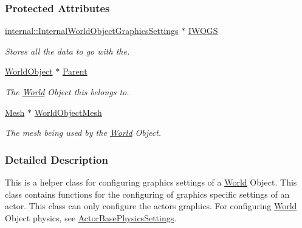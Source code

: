 \subsubsection*{Protected Attributes}
\begin{DoxyCompactItemize}
\item 
\hypertarget{classMezzanine_1_1WorldObjectGraphicsSettings_a8a0fc129db71e68740a5ab5fd33cb0d2}{
\hyperlink{classMezzanine_1_1internal_1_1InternalWorldObjectGraphicsSettings}{internal::InternalWorldObjectGraphicsSettings} $\ast$ \hyperlink{classMezzanine_1_1WorldObjectGraphicsSettings_a8a0fc129db71e68740a5ab5fd33cb0d2}{IWOGS}}
\label{classMezzanine_1_1WorldObjectGraphicsSettings_a8a0fc129db71e68740a5ab5fd33cb0d2}

\begin{DoxyCompactList}\small\item\em Stores all the data to go with the. \item\end{DoxyCompactList}\item 
\hypertarget{classMezzanine_1_1WorldObjectGraphicsSettings_a3c3e1552382dd78af68a561464bca083}{
\hyperlink{classMezzanine_1_1WorldObject}{WorldObject} $\ast$ \hyperlink{classMezzanine_1_1WorldObjectGraphicsSettings_a3c3e1552382dd78af68a561464bca083}{Parent}}
\label{classMezzanine_1_1WorldObjectGraphicsSettings_a3c3e1552382dd78af68a561464bca083}

\begin{DoxyCompactList}\small\item\em The \hyperlink{classMezzanine_1_1World}{World} Object this belongs to. \item\end{DoxyCompactList}\item 
\hypertarget{classMezzanine_1_1WorldObjectGraphicsSettings_a8a0d95feee013e0374878bd5c2f5120c}{
\hyperlink{classMezzanine_1_1Mesh}{Mesh} $\ast$ \hyperlink{classMezzanine_1_1WorldObjectGraphicsSettings_a8a0d95feee013e0374878bd5c2f5120c}{WorldObjectMesh}}
\label{classMezzanine_1_1WorldObjectGraphicsSettings_a8a0d95feee013e0374878bd5c2f5120c}

\begin{DoxyCompactList}\small\item\em The mesh being used by the \hyperlink{classMezzanine_1_1World}{World} Object. \item\end{DoxyCompactList}\end{DoxyCompactItemize}


\subsubsection{Detailed Description}
This is a helper class for configuring graphics settings of a \hyperlink{classMezzanine_1_1World}{World} Object. This class contains functions for the configuring of graphics specific settings of an actor. This class can only configure the actors graphics. For configuring \hyperlink{classMezzanine_1_1World}{World} Object physics, see \hyperlink{classMezzanine_1_1ActorBasePhysicsSettings}{ActorBasePhysicsSettings}. 

